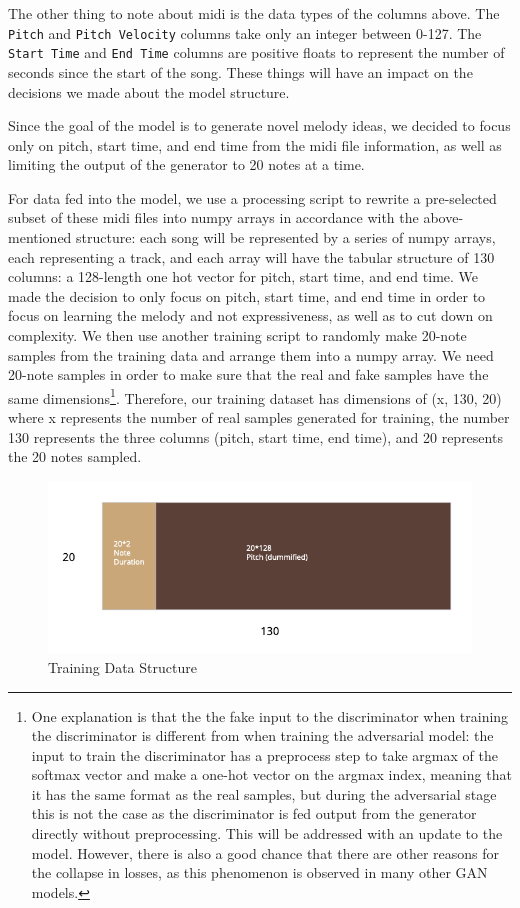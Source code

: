 \documentclass[12pt,oneside]{chicagocapstone}
\begin{document}
The other thing to note about midi is the data types of the columns above. The \texttt{Pitch} and \texttt{Pitch\ Velocity} columns take only an integer between 0-127. The \texttt{Start\ Time} and \texttt{End\ Time} columns are positive floats to represent the number of seconds since the start of the song. These things will have an impact on the decisions we made about the model structure.

Since the goal of the model is to generate novel melody ideas, we decided to focus only on pitch, start time, and end time from the midi file information, as well as limiting the output of the generator to 20 notes at a time.

For data fed into the model, we use a processing script to rewrite a pre-selected subset of these midi files into numpy arrays in accordance with the above-mentioned structure: each song will be represented by a series of numpy arrays, each representing a track, and each array will have the tabular structure of 130 columns: a 128-length one hot vector for pitch, start time, and end time. We made the decision to only focus on pitch, start time, and end time in order to focus on learning the melody and not expressiveness, as well as to cut down on complexity. We then use another training script to randomly make 20-note samples from the training data and arrange them into a numpy array. We need 20-note samples in order to make sure that the real and fake samples have the same dimensions\footnote{One explanation is that the the fake input to the discriminator when training the discriminator is different from when training the adversarial model: the input to train the discriminator has a preprocess step to take argmax of the softmax vector and make a one-hot vector on the argmax index, meaning that it has the same format as the real samples, but during the adversarial stage this is not the case as the discriminator is fed output from the generator directly without preprocessing. This will be addressed with an update to the model. However, there is also a good chance that there are other reasons for the collapse in losses, as this phenomenon is observed in many other GAN models.}. Therefore, our training dataset has dimensions of (x, 130, 20) where x represents the number of real samples generated for training, the number 130 represents the three columns (pitch, start time, end time), and 20 represents the 20 notes sampled.
\begin{figure}

{\centering \includegraphics[width=0.8\linewidth]{figure/training_data_structure} 

}

\caption{Training Data Structure}\label{fig:unnamed-chunk-3}
\end{figure}
\end{document}
